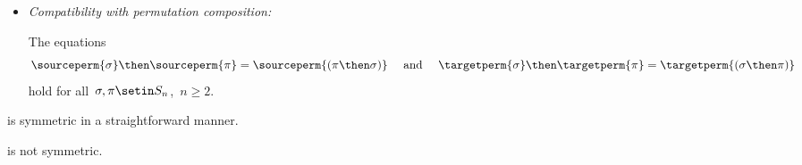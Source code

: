 \begin{ctdefinition}
\begin{itemize}
        \item \emph{Compatibility with permutation composition:}

              The equations
              \begin{equation}
                  \sourceperm{\sigma} \then \sourceperm{\pi} = \sourceperm{(\pi\then\sigma)}
                  \quad \text{ and } \quad
                  \targetperm{\sigma} \then \targetperm{\pi} = \targetperm{(\sigma \then \pi)}
              \end{equation}
              hold for all~$\sigma, \pi \setin S_n$,~$n \geq 2$.

    \end{itemize}
\end{ctdefinition}


\begin{example}
    \SetL is symmetric in a straightforward manner.
\end{example}

\begin{lemma}
    \Effects is not symmetric.
\end{lemma}



